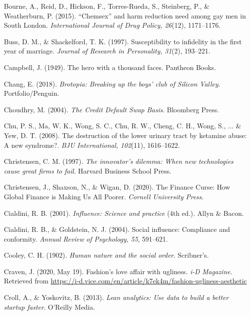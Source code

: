 \begin{thebibliography}{}
    Bourne, A., Reid, D., Hickson, F., Torres-Rueda, S., Steinberg, P., \& Weatherburn, P. (2015). “Chemsex” and harm reduction need among gay men in South London. \textit{International Journal of Drug Policy, 26}(12), 1171–1176.
    
    Buss, D. M., \& Shackelford, T. K. (1997). Susceptibility to infidelity in the first year of marriage. \textit{Journal of Research in Personality, 31}(2), 193–221.


    Campbell, J. (1949). The hero with a thousand faces. Pantheon Books.   

    Chang, E. (2018). \textit{Brotopia: Breaking up the boys' club of Silicon Valley}. Portfolio/Penguin.

    Choudhry, M. (2004). \textit{The Credit Default Swap Basis}. Bloomberg Press.

    Chu, P. S., Ma, W. K., Wong, S. C., Chu, R. W., Cheng, C. H., Wong, S., ... \& Yew, D. T. (2008). The destruction of the lower urinary tract by ketamine abuse: A new syndrome?. \textit{BJU International, 102}(11), 1616–1622.

    Christensen, C. M. (1997). \textit{The innovator's dilemma: When new technologies cause great firms to fail}. Harvard Business School Press.

    Christensen, J., Shaxson, N., \& Wigan, D. (2020). The Finance Curse: How Global Finance is Making Us All Poorer. \textit{Cornell University Press}.

    Cialdini, R. B. (2001). \textit{Influence: Science and practice} (4th ed.). Allyn \& Bacon.
    
    Cialdini, R. B., \& Goldstein, N. J. (2004). Social influence: Compliance and conformity. \textit{Annual Review of Psychology, 55}, 591–621.

    Cooley, C. H. (1902). \textit{Human nature and the social order}. Scribner’s.

    Craven, J. (2020, May 19). Fashion's love affair with ugliness. \textit{i-D Magazine}. Retrieved from \url{https://i-d.vice.com/en/article/k7ek4m/fashion-ugliness-aesthetic}

    Croll, A., \& Yoskovitz, B. (2013). \textit{Lean analytics: Use data to build a better startup faster}. O’Reilly Media.


\end{thebibliography}
